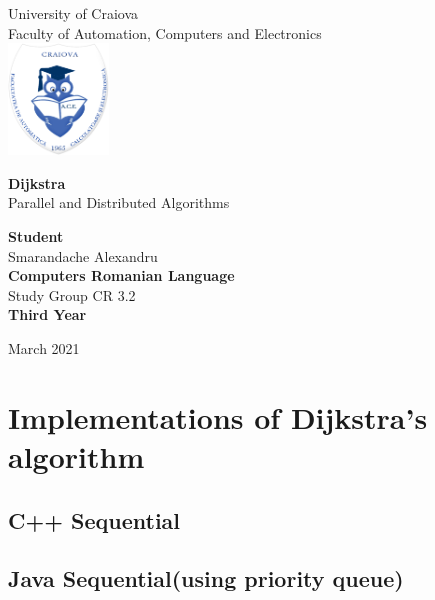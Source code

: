 \documentclass[14ppt]{article}
\begin{document}
\begin{titlepage}
    \begin{center}
    \Large
        University of Craiova\\
        Faculty of Automation, Computers and Electronics\\
         \includegraphics[width=0.2\textwidth]{ace.png}
        \vspace*{2cm}
            
        \Huge{\textbf{Dijkstra}\\}
        \vspace{0.3cm}
        \Large
        Parallel and Distributed Algorithms
            
        \vspace{1.5cm}
            
        \Large \textbf{Student}\\ Smarandache Alexandru
        \\\vspace{0.25cm}
        \Large{\textbf{Computers Romanian Language }}\\
        \Large{Study Group CR 3.2}\\
         \Large{\textbf{Third Year}}\\
        \vfill
    
        \vspace{0.8cm}
            
        \Large
        March 2021
    \end{center}
\end{titlepage}
\begin{center}
\tableofcontents
\end{center}

\newpage
\section{Implementations of Dijkstra's algorithm}
\subsection{C++ Sequential}
\subsection{Java Sequential(using priority queue)}
\end{document}
